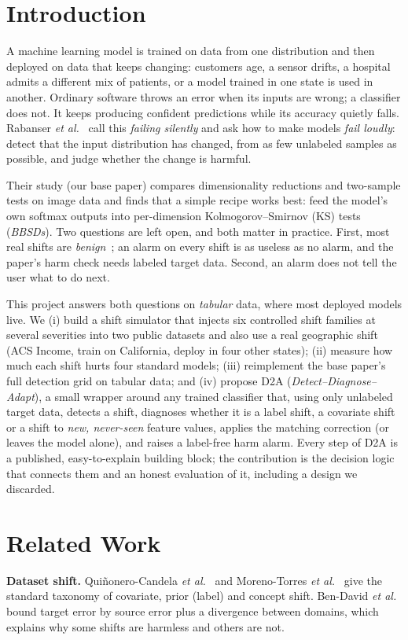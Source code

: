 \documentclass[conference]{IEEEtran}
\newcommand{\Dtwo}{\textsc{D2A}}
\begin{document}
\section{Introduction}
A machine learning model is trained on data from one distribution and then deployed on data that keeps changing: customers age, a sensor drifts, a hospital admits a different mix of patients, or a model trained in one state is used in another. Ordinary software throws an error when its inputs are wrong; a classifier does not. It keeps producing confident predictions while its accuracy quietly falls. Rabanser \emph{et al.}~\cite{rabanser2019failing} call this \emph{failing silently} and ask how to make models \emph{fail loudly}: detect that the input distribution has changed, from as few unlabeled samples as possible, and judge whether the change is harmful.

Their study (our base paper) compares dimensionality reductions and two-sample tests on image data and finds that a simple recipe works best: feed the model's own softmax outputs into per-dimension Kolmogorov--Smirnov (KS) tests (\emph{BBSDs}). Two questions are left open, and both matter in practice. First, most real shifts are \emph{benign}~\cite{rabanser2019failing,liu2023whyshift}; an alarm on every shift is as useless as no alarm, and the paper's harm check needs labeled target data. Second, an alarm does not tell the user what to do next.

This project answers both questions on \emph{tabular} data, where most deployed models live. We (i) build a shift simulator that injects six controlled shift families at several severities into two public datasets and also use a real geographic shift (ACS Income, train on California, deploy in four other states); (ii) measure how much each shift hurts four standard models; (iii) reimplement the base paper's full detection grid on tabular data; and (iv) propose \Dtwo{} (\emph{Detect--Diagnose--Adapt}), a small wrapper around any trained classifier that, using only unlabeled target data, detects a shift, diagnoses whether it is a label shift, a covariate shift or a shift to \emph{new, never-seen} feature values, applies the matching correction (or leaves the model alone), and raises a label-free harm alarm. Every step of \Dtwo{} is a published, easy-to-explain building block; the contribution is the decision logic that connects them and an honest evaluation of it, including a design we discarded.

\section{Related Work}
\textbf{Dataset shift.} Qui\~{n}onero-Candela \emph{et al.}~\cite{quionero2009} and Moreno-Torres \emph{et al.}~\cite{morenotorres2012} give the standard taxonomy of covariate, prior (label) and concept shift. Ben-David \emph{et al.}~\cite{bendavid2010} bound target error by source error plus a divergence between domains, which explains why some shifts are harmless and others are not.
\end{document}
